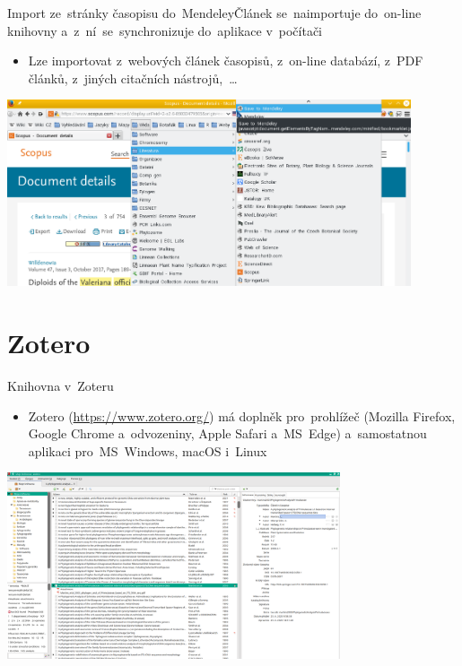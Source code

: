 \documentclass[compress, ucs, xelatex, 11pt, xcolor=svgnames, aspectratio=169,
	hyperref={
		bookmarks=true,
		unicode=true,
		colorlinks=true,
		pdftitle={Citacni software},
		plainpages=false,
		pdfauthor={Vojtech Zeisek},
		pdfsubject={Kratky uvod do citacniho software},
		pdfcreator={XeLaTeX},
		pdfkeywords={citace, reference, software, literatura},
		linkcolor=Crimson, %
		anchorcolor=Magenta, %
		citecolor=Magenta, %
		filecolor=Magenta, %
		menucolor=Magenta, %
		urlcolor=DarkTurquoise, %
		pdftex},
	url={hyphens, lowtilde} %
	]{beamer}
\begin{document}
\begin{frame}{Import ze~stránky časopisu do~Mendeley}{Článek se~naimportuje do~on-line knihovny a~z~ní~se~synchronizuje do~aplikace v~počítači}
	\begin{itemize}
		\item Lze importovat z~webových článek časopisů, z~on-line databází, z~PDF článků, z~jiných citačních nástrojů,~\ldots
	\end{itemize}
	\begin{center}
		\includegraphics[height=5.5cm]{mendeley_web_import.png}
	\end{center}
\end{frame}

\section{Zotero}

\begin{frame}{Knihovna v~Zoteru}
	\begin{itemize}
		\item Zotero (\url{https://www.zotero.org/}) má doplněk pro~prohlížeč (Mozilla Firefox, Google Chrome a~odvozeniny, Apple Safari a~MS~Edge) a~samostatnou aplikaci pro~MS~Windows, macOS i~Linux
	\end{itemize}
	\begin{center}
		\includegraphics[height=5.5cm]{zotero.png}
	\end{center}
\end{frame}
\end{document}
